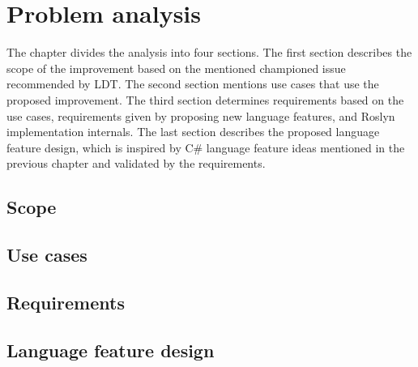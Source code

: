 \chapter{Problem analysis}
The chapter divides the analysis into four sections. 
The first section describes the scope of the improvement based on the mentioned championed issue recommended by \ac{LDT}. 
The second section mentions use cases that use the proposed improvement. 
The third section determines requirements based on the use cases, requirements given by proposing new language features, and Roslyn implementation internals. 
The last section describes the proposed language feature design, which is inspired by C\# language feature ideas mentioned in the previous chapter and validated by the requirements.

\section{Scope}

\section{Use cases}

\section{Requirements}

\section{Language feature design}






